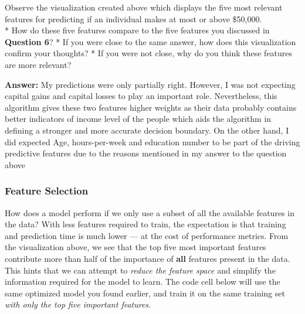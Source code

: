 \documentclass[11pt]{article}
\begin{document}
Observe the visualization created above which displays the five most
relevant features for predicting if an individual makes at most or above
\$50,000.\\
* How do these five features compare to the five features you discussed
in \textbf{Question 6}? * If you were close to the same answer, how does
this visualization confirm your thoughts? * If you were not close, why
do you think these features are more relevant?

    \textbf{Answer:} My predictions were only partially right. However, I
was not expecting capital gains and capital losses to play an important
role. Nevertheless, this algorithm gives these two features higher
weights as their data probably contains better indicators of income
level of the people which aids the algorithm in defining a stronger and
more accurate decision boundary. On the other hand, I did expected Age,
hours-per-week and education number to be part of the driving predictive
features due to the reasons mentioned in my answer to the question above

    \subsubsection{Feature Selection}\label{feature-selection}

How does a model perform if we only use a subset of all the available
features in the data? With less features required to train, the
expectation is that training and prediction time is much lower --- at
the cost of performance metrics. From the visualization above, we see
that the top five most important features contribute more than half of
the importance of \textbf{all} features present in the data. This hints
that we can attempt to \emph{reduce the feature space} and simplify the
information required for the model to learn. The code cell below will
use the same optimized model you found earlier, and train it on the same
training set \emph{with only the top five important features}.
\end{document}
